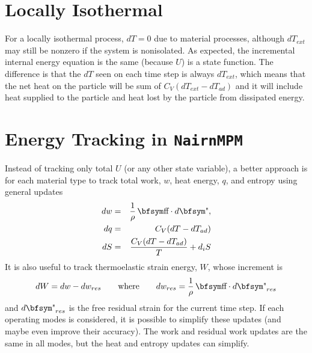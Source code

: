 \documentclass[11pt]{book}
\def\st{{\hbox{\bfsym\char'033}}}
\def\et{{\hbox{\bfsym\char'042}}}
\begin{document}
\section{Locally Isothermal}

For a locally isothermal process, $dT=0$ due to material processes, although $dT_{ext}$ may still be nonzero if the system is nonisolated. As expected, the incremental internal energy equation is the same (because $U$) is a state function. The difference is that the $dT$ seen on each time step is always $dT_{ext}$, which means that the net heat on the particle will be sum of $C_V(dT_{ext}-dT_{ad})$ and it will include heat supplied to the particle and heat lost by the particle from dissipated energy.

\section{Energy Tracking in {\tt NairnMPM}\label{EnergyUpdates}}

Instead of tracking only total $U$ (or any other state variable), a better approach is for each material type to track total work, $w$,  heat energy, $q$, and entropy using general updates
\begin{eqnarray}
           dw & = & {1\over \rho}\thinspace \st\cdot d\et, \\
           dq & = & C_V (dT - dT_{ad})  \\
           dS & = & {C_V (dT - dT_{ad})\over T} + d_iS
\end{eqnarray}
It is also useful to track thermoelastic strain energy, $W$, whose increment is
\begin{equation}
     dW = dw - dw_{res} \qquad {\rm where} \qquad dw_{res} = {1\over \rho}\thinspace \st\cdot d\et_{res}
\end{equation}
and $d\et_{res}$ is the free residual strain for the current time step.
If each operating modes is considered, it is possible to simplify these updates (and maybe even improve their accuracy). The work and residual work updates are the same in all modes, but the heat and entropy updates can simplify.
\end{document}
